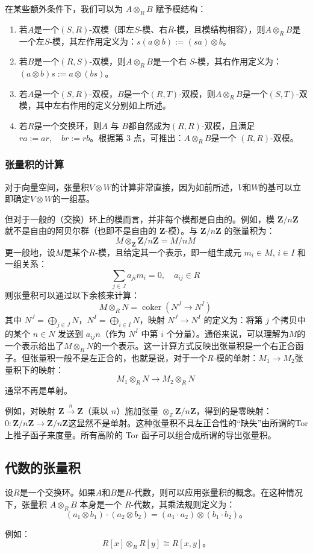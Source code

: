 在某些额外条件下，我们可以为 \( A \otimes_R B \) 赋予模结构：

\begin{enumerate}
\item 若\( A \)是一个\( (S, R) \)-双模（即左\( S \)-模、右\( R \)-模，且模结构相容），则\(A \otimes_R B\)是一个左\( S \)-模，其左作用定义为：\(s(a \otimes b) := (sa) \otimes b\)。
\item 若\( B \)是一个\( (R, S) \)-双模，则\(A \otimes_R B\)是一个右 \( S \)-模，其右作用定义为：\((a \otimes b)s := a \otimes (bs)\)。
\item 若\( A \)是一个\( (S, R) \)-双模，\( B \)是一个\( (R, T) \)-双模，则\(A \otimes_R B \)是一个\( (S, T) \)-双模，其中左右作用的定义分别如上所述。
\item 若\( R \)是一个交换环，则\( A \) 与 \( B \)都自然成为\( (R, R) \)-双模，且满足\(ra := ar, \quad br := rb\)。根据第 3 点，可推出：\(A \otimes_R B\)是一个 \( (R, R) \)-双模。
\end{enumerate}
\subsubsection{张量积的计算}
对于向量空间，张量积\( V \otimes W \)的计算非常直接，因为如前所述，\( V \)和\( W \)的基可以立即确定\( V \otimes W \)的一组基。

但对于一般的（交换）环上的模而言，并非每个模都是自由的。例如，模 \( \mathbf{Z}/n\mathbf{Z} \) 就不是自由的阿贝尔群（也即不是自由的 \( \mathbf{Z} \)-模）。与 \( \mathbf{Z}/n\mathbf{Z} \) 的张量积为：
\[
M \otimes_{\mathbf{Z}} \mathbf{Z}/n\mathbf{Z} = M / nM~
\]
更一般地，设\( M \)是某个\( R \)-模，且给定其一个表示，即一组生成元 \( m_i \in M,\, i \in I \) 和一组关系：
\[
\sum_{j \in J} a_{ji} m_i = 0,\quad a_{ij} \in R~
\]
则张量积可以通过以下余核来计算：
\[
M \otimes_R N = \operatorname{coker}(N^J \to N^I)~
\]
其中 \( N^J = \bigoplus_{j \in J} N \)，\( N^I = \bigoplus_{i \in I} N \)，映射 \( N^J \to N^I \) 的定义为：将第 \( j \) 个拷贝中的某个 \( n \in N \) 发送到 \( a_{ij} n \)（作为 \( N^I \) 中第 \( i \) 个分量）。通俗来说，可以理解为\( M \)的一个表示给出了\( M \otimes_R N \)的一个表示。这一计算方式反映出张量积是一个右正合函子。但张量积一般不是左正合的，也就是说，对于一个\( R \)-模的单射：\(M_1 \to M_2\)张量积下的映射：
\[
M_1 \otimes_R N \to M_2 \otimes_R N~
\]
通常不再是单射。

例如，对映射 \( \mathbf{Z} \xrightarrow{n} \mathbf{Z} \)（乘以 \( n \)）施加张量 \( \otimes_{\mathbb{Z}} \mathbf{Z}/n\mathbf{Z} \)，得到的是零映射：\(0 : \mathbf{Z}/n\mathbf{Z} \to \mathbf{Z}/n\mathbf{Z}\)这显然不是单射。这种张量积不具左正合性的“缺失”由所谓的Tor 上推子函子来度量。所有高阶的 Tor 函子可以组合成所谓的导出张量积。
\subsection{代数的张量积}
设\( R \)是一个交换环。如果\( A \)和\( B \)是\( R \)-代数，则可以应用张量积的概念。在这种情况下，张量积 \( A \otimes_R B \) 本身是一个 \( R \)-代数，其乘法规则定义为：
\[
(a_1 \otimes b_1) \cdot (a_2 \otimes b_2) = (a_1 \cdot a_2) \otimes (b_1 \cdot b_2)。
\]

例如：
\[
R[x] \otimes_R R[y] \cong R[x, y]。
\]


